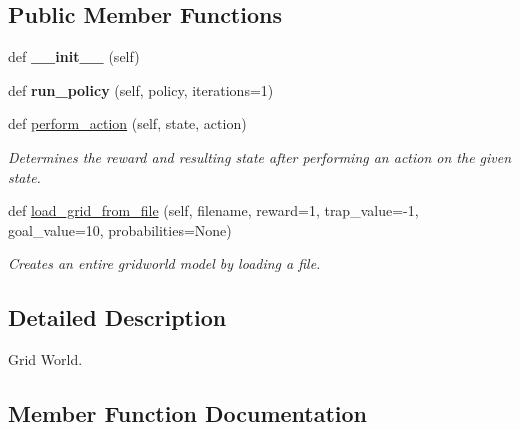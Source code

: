 \subsection*{Public Member Functions}
\begin{DoxyCompactItemize}
\item 
\mbox{\label{classsrc_1_1worlds_1_1grid__world_1_1_grid_world_afe3c1b392afbc00fb9a76c14a6e07899}} 
def {\bfseries \+\_\+\+\_\+init\+\_\+\+\_\+} (self)
\item 
\mbox{\label{classsrc_1_1worlds_1_1grid__world_1_1_grid_world_a2ec82897b648609647d645f9b5835593}} 
def {\bfseries run\+\_\+policy} (self, policy, iterations=1)
\item 
def \hyperlink{classsrc_1_1worlds_1_1grid__world_1_1_grid_world_a93de8a88475e8ad0530fe703343028c9}{perform\+\_\+action} (self, state, action)
\begin{DoxyCompactList}\small\item\em Determines the reward and resulting state after performing an action on the given state. \end{DoxyCompactList}\item 
def \hyperlink{classsrc_1_1worlds_1_1grid__world_1_1_grid_world_ab4f846eef24e9c63aa73c6bc9503953d}{load\+\_\+grid\+\_\+from\+\_\+file} (self, filename, reward=1, trap\+\_\+value=-\/1, goal\+\_\+value=10, probabilities=None)
\begin{DoxyCompactList}\small\item\em Creates an entire gridworld model by loading a file. \end{DoxyCompactList}\end{DoxyCompactItemize}


\subsection{Detailed Description}
Grid World. 

\subsection{Member Function Documentation}
\mbox{\label{classsrc_1_1worlds_1_1grid__world_1_1_grid_world_ab4f846eef24e9c63aa73c6bc9503953d}} 
